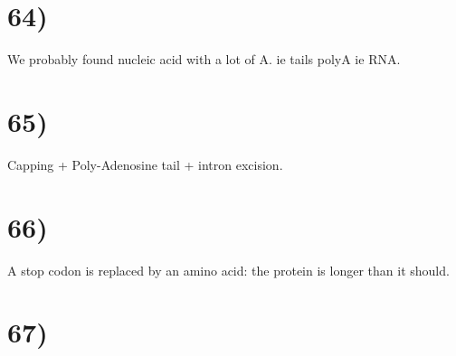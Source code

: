 \section*{64)}
We probably found nucleic acid with a lot of A. ie tails polyA ie RNA.

\section*{65)}
Capping + Poly-Adenosine tail + intron excision.

\section*{66)}
A stop codon is replaced by an amino acid: the protein is longer than it should.


\section*{67)}



